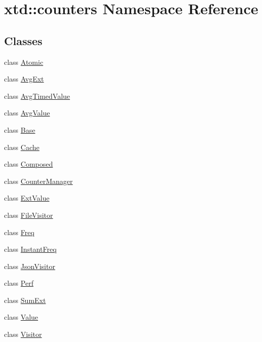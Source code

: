 \hypertarget{namespacextd_1_1counters}{}\section{xtd\+:\+:counters Namespace Reference}
\label{namespacextd_1_1counters}
\subsection*{Classes}
\begin{DoxyCompactItemize}
\item 
class \hyperlink{classxtd_1_1counters_1_1Atomic}{Atomic}
\item 
class \hyperlink{classxtd_1_1counters_1_1AvgExt}{Avg\+Ext}
\item 
class \hyperlink{classxtd_1_1counters_1_1AvgTimedValue}{Avg\+Timed\+Value}
\item 
class \hyperlink{classxtd_1_1counters_1_1AvgValue}{Avg\+Value}
\item 
class \hyperlink{classxtd_1_1counters_1_1Base}{Base}
\item 
class \hyperlink{classxtd_1_1counters_1_1Cache}{Cache}
\item 
class \hyperlink{classxtd_1_1counters_1_1Composed}{Composed}
\item 
class \hyperlink{classxtd_1_1counters_1_1CounterManager}{Counter\+Manager}
\item 
class \hyperlink{classxtd_1_1counters_1_1ExtValue}{Ext\+Value}
\item 
class \hyperlink{classxtd_1_1counters_1_1FileVisitor}{File\+Visitor}
\item 
class \hyperlink{classxtd_1_1counters_1_1Freq}{Freq}
\item 
class \hyperlink{classxtd_1_1counters_1_1InstantFreq}{Instant\+Freq}
\item 
class \hyperlink{classxtd_1_1counters_1_1JsonVisitor}{Json\+Visitor}
\item 
class \hyperlink{classxtd_1_1counters_1_1Perf}{Perf}
\item 
class \hyperlink{classxtd_1_1counters_1_1SumExt}{Sum\+Ext}
\item 
class \hyperlink{classxtd_1_1counters_1_1Value}{Value}
\item 
class \hyperlink{classxtd_1_1counters_1_1Visitor}{Visitor}
\end{DoxyCompactItemize}
